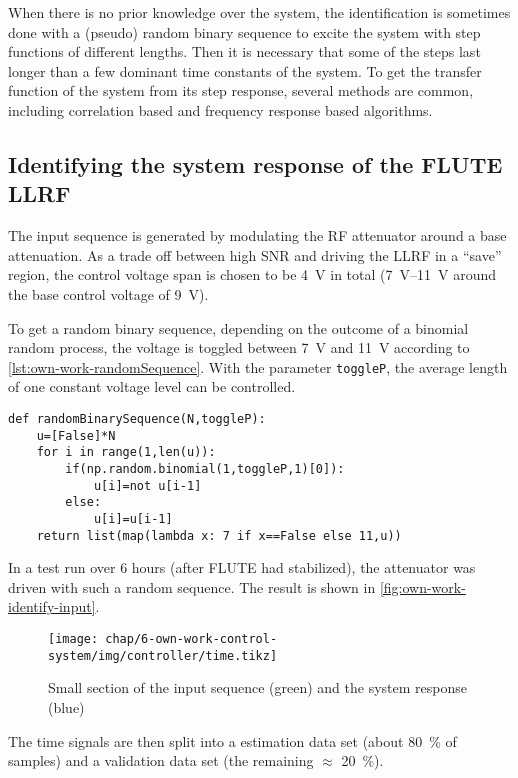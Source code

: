 When there is no prior knowledge over the system, the identification is sometimes done with a (pseudo) random binary sequence to excite the system with step functions of different lengths. Then it is necessary that some of the steps last longer than a few dominant time constants of the system. To get the transfer function of the system from its step response, several methods are common, including correlation based and frequency response based algorithms.

\subsection{Identifying the system response of the FLUTE LLRF}
The input sequence is generated by modulating the RF attenuator around a base attenuation. As a trade off between high SNR and driving the LLRF in a ``save'' region, the control voltage span is chosen to be \SI{4}{\volt} in total (\SIrange{7}{11}{\volt} around the base control voltage of \SI{9}{\volt}).

To get a random binary sequence, depending on the outcome of a binomial random process, the voltage is toggled between \SI{7}{\volt} and \SI{11}{\volt} according to \autoref{lst:own-work-randomSequence}. With the parameter \texttt{toggleP}, the average length of one constant voltage level can be controlled.

\begin{lstlisting}[style=python,caption = Function to get a random binary sequence, label = lst:own-work-randomSequence]
def randomBinarySequence(N,toggleP):
    u=[False]*N
    for i in range(1,len(u)):
        if(np.random.binomial(1,toggleP,1)[0]):
            u[i]=not u[i-1]
        else:
            u[i]=u[i-1]
    return list(map(lambda x: 7 if x==False else 11,u))
\end{lstlisting}

In a test run over 6 hours (after FLUTE had stabilized), the attenuator was driven with such a random sequence. The result is shown in \autoref{fig:own-work-identify-input}.

\begin{figure}[tb]
	\centering
	\texttt{[image: chap/6-own-work-control-system/img/controller/time.tikz]}
	\caption{Small section of the input sequence (green) and the system response (blue)}
	\label{fig:own-work-identify-input}
\end{figure}

The time signals are then split into a estimation data set (about \SI{80}{\percent} of samples) and a validation data set (the remaining $\approx$ \SI{20}{\percent}).

